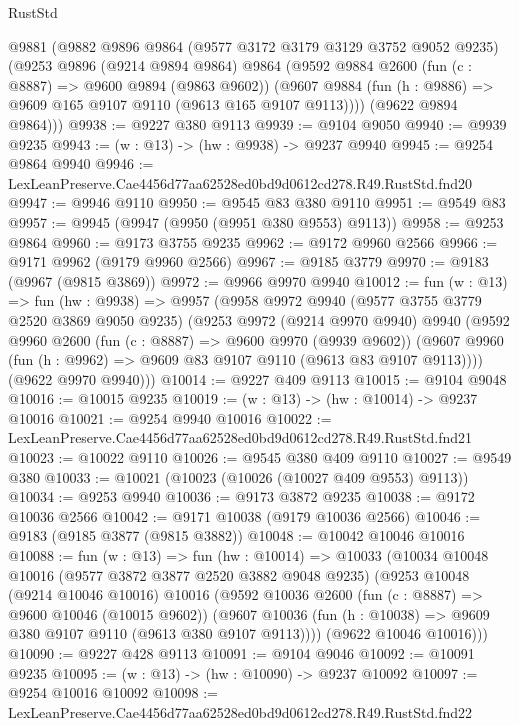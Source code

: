 \begin{lexlean}{RustStd}
\begin{coremodule}
  @9881
    (@9882
      @9896
      @9864
      (@9577 @3172 @3179 @3129 @3752 @9052 @9235)
      (@9253
        @9896
        (@9214 @9894 @9864)
        @9864
        (@9592
          @9884
          @2600
          (fun (c : @8887) => @9600 @9894 (@9863 @9602))
          (@9607 @9884 (fun (h : @9886) => @9609 @165 @9107 @9110 (@9613 @165 @9107 @9113))))
        (@9622 @9894 @9864)))
@9938 := @9227 @380 @9113
@9939 := @9104 @9050
@9940 := @9939 @9235
@9943 := (w : @13) -> (hw : @9938) -> @9237 @9940
@9945 := @9254 @9864 @9940
@9946 := LexLeanPreserve.Cae4456d77aa62528ed0bd9d0612cd278.R49.RustStd.fnd20
@9947 := @9946 @9110
@9950 := @9545 @83 @380 @9110
@9951 := @9549 @83
@9957 := @9945 (@9947 (@9950 (@9951 @380 @9553) @9113))
@9958 := @9253 @9864
@9960 := @9173 @3755 @9235
@9962 := @9172 @9960 @2566
@9966 := @9171 @9962 (@9179 @9960 @2566)
@9967 := @9185 @3779
@9970 := @9183 (@9967 (@9815 @3869))
@9972 := @9966 @9970 @9940
@10012 := fun (w : @13) =>
  fun (hw : @9938) =>
  @9957
    (@9958
      @9972
      @9940
      (@9577 @3755 @3779 @2520 @3869 @9050 @9235)
      (@9253
        @9972
        (@9214 @9970 @9940)
        @9940
        (@9592
          @9960
          @2600
          (fun (c : @8887) => @9600 @9970 (@9939 @9602))
          (@9607 @9960 (fun (h : @9962) => @9609 @83 @9107 @9110 (@9613 @83 @9107 @9113))))
        (@9622 @9970 @9940)))
@10014 := @9227 @409 @9113
@10015 := @9104 @9048
@10016 := @10015 @9235
@10019 := (w : @13) -> (hw : @10014) -> @9237 @10016
@10021 := @9254 @9940 @10016
@10022 := LexLeanPreserve.Cae4456d77aa62528ed0bd9d0612cd278.R49.RustStd.fnd21
@10023 := @10022 @9110
@10026 := @9545 @380 @409 @9110
@10027 := @9549 @380
@10033 := @10021 (@10023 (@10026 (@10027 @409 @9553) @9113))
@10034 := @9253 @9940
@10036 := @9173 @3872 @9235
@10038 := @9172 @10036 @2566
@10042 := @9171 @10038 (@9179 @10036 @2566)
@10046 := @9183 (@9185 @3877 (@9815 @3882))
@10048 := @10042 @10046 @10016
@10088 := fun (w : @13) =>
  fun (hw : @10014) =>
  @10033
    (@10034
      @10048
      @10016
      (@9577 @3872 @3877 @2520 @3882 @9048 @9235)
      (@9253
        @10048
        (@9214 @10046 @10016)
        @10016
        (@9592
          @10036
          @2600
          (fun (c : @8887) => @9600 @10046 (@10015 @9602))
          (@9607 @10036 (fun (h : @10038) => @9609 @380 @9107 @9110 (@9613 @380 @9107 @9113))))
        (@9622 @10046 @10016)))
@10090 := @9227 @428 @9113
@10091 := @9104 @9046
@10092 := @10091 @9235
@10095 := (w : @13) -> (hw : @10090) -> @9237 @10092
@10097 := @9254 @10016 @10092
@10098 := LexLeanPreserve.Cae4456d77aa62528ed0bd9d0612cd278.R49.RustStd.fnd22

\end{coremodule}
\end{lexlean}
